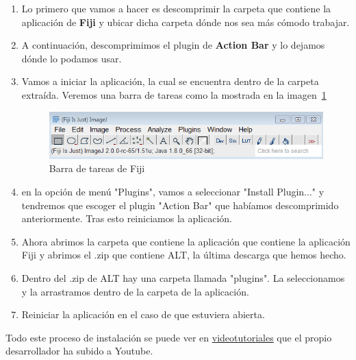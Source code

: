 \begin{enumerate}
	\item Lo primero que vamos a hacer es descomprimir la carpeta que contiene la aplicación de \textbf{Fiji} y ubicar dicha carpeta dónde nos sea más cómodo trabajar.
	\item A continuación, descomprimimos el plugin de \textbf{Action Bar} y lo dejamos dónde lo podamos usar.
	\item Vamos a iniciar la aplicación, la cual se encuentra dentro de la carpeta extraída. Veremos una barra de tareas como la mostrada en la imagen~\ref{fig:barra_de_tareas}
	\begin{figure}
		\centering
		\includegraphics[width=0.7\linewidth]{img/barra}
		\caption{Barra de tareas de Fiji}
		\label{fig:barra_de_tareas}
	\end{figure}
	
	\item en la opción de menú "Plugins", vamos a seleccionar "Install Plugin..."	y tendremos que escoger el plugin "Action Bar" que habíamos descomprimido anteriormente. Tras esto reiniciamos la aplicación.
	\item Ahora abrimos la carpeta que contiene la aplicación que contiene la aplicación Fiji y abrimos el .zip que contiene ALT, la última descarga que hemos hecho. 
	\item Dentro del .zip de ALT hay una carpeta llamada "plugins". La seleccionamos y la arrastramos dentro de la carpeta de la aplicación.
	\item Reiniciar la aplicación en el caso de que estuviera abierta.
\end{enumerate}
Todo este proceso de instalación se puede ver en \href{https://www.youtube.com/watch?v=G6ib950iDvQ}{videotutoriales} que el propio desarrollador ha subido a Youtube.
